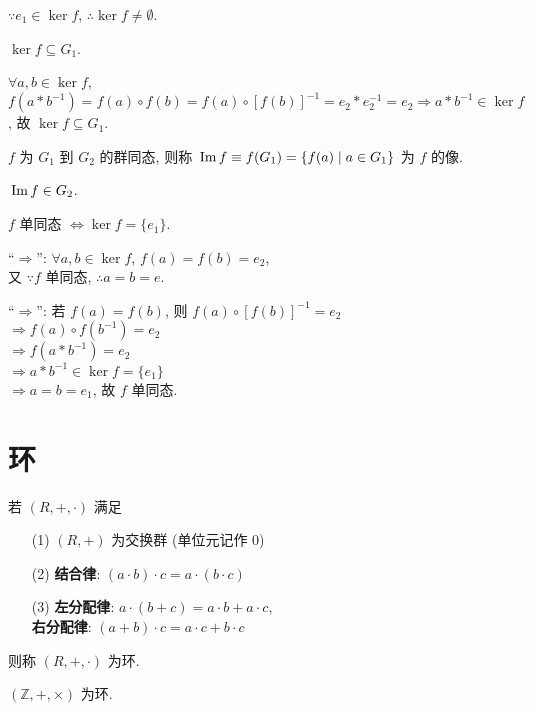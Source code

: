 \documentclass{note}
\begin{document}
$\because e_1\in\ker f$, $\therefore\ker f\neq\emptyset$.

$\ker f\subseteq G_1$.
\begin{pf}
    $\forall a,b\in\ker f$, $f(a*b^{-1})=f(a)\circ f(b)=f(a)\circ[f(b)]^{-1}=e_2*e_2^{-1}=e_2\Longrightarrow a*b^{-1}\in\ker f$, 故 $\ker f\subseteq G_1$.
\end{pf}

\begin{df}[群同态的像]
    $f$ 为 $G_1$ 到 $G_2$ 的群同态, 则称 $\,\mathrm{Im}\, f\equiv f(G_1)=\{f(a)\mid a\in G_1\}$ 为 $f$ 的像.
\end{df}

$\,\mathrm{Im}\, f\in G_2$.

\begin{thm}
    $f$ 单同态 $\Longleftrightarrow\ker f=\{e_1\}$.
\end{thm}
\begin{pf}
    ``$\Longrightarrow$'': $\forall a,b\in\ker f$, $f(a)=f(b)=e_2$,\\
    又 $\because f$ 单同态, $\therefore a=b=e$.

    ``$\Longrightarrow$'': 若 $f(a)=f(b)$, 则 $f(a)\circ[f(b)]^{-1}=e_2$\\
    $\Longrightarrow f(a)\circ f(b^{-1})=e_2$\\
    $\Longrightarrow f(a*b^{-1})=e_2$\\
    $\Longrightarrow a*b^{-1}\in\ker f=\{e_1\}$\\
    $\Longrightarrow a=b=e_1$, 故 $f$ 单同态.
\end{pf}

\section{环}
\begin{df}[环]
    若 $(R,+,\cdot)$ 满足
    \begin{itemize}
        \item[(1)] $(R,+)$ 为交换群 (单位元记作 $0$)
        \item[(2)] \textbf{结合律}: $(a\cdot b)\cdot c=a\cdot(b\cdot c)$
        \item[(3)] \textbf{左分配律}: $a\cdot(b+c)=a\cdot b+a\cdot c$,\\
        \textbf{右分配律}: $(a+b)\cdot c=a\cdot c+b\cdot c$
    \end{itemize}
    则称 $(R,+,\cdot)$ 为环.
\end{df}

\begin{eg}
    $(\mathbb{Z},+,\times)$ 为环.
\end{eg}
\end{document}
